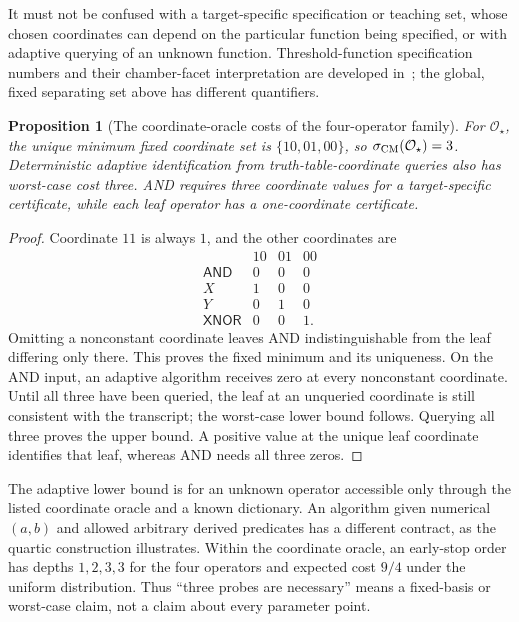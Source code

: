 \documentclass[11pt]{article}
\newtheorem{proposition}[theorem]{Proposition}
\theoremstyle{definition}
\theoremstyle{remark}
\newcommand{\AND}{\mathsf{AND}}
\newcommand{\XNOR}{\mathsf{XNOR}}
\newcommand{\Oo}{\mathcal O}
\begin{document}
It must not be confused with a target-specific specification or teaching set, whose chosen coordinates can depend on the particular function being specified, or with adaptive querying of an unknown function. Threshold-function specification numbers and their chamber-facet interpretation are developed in~\cite{Anthony2026}; the global, fixed separating set above has different quantifiers.

\begin{proposition}[The coordinate-oracle costs of the four-operator family]\label{prop:star}
For $\Oo_\star$, the unique minimum fixed coordinate set is $\{10,01,00\}$, so $\sigma_{\rm CM}(\Oo_\star)=3$. Deterministic adaptive identification from truth-table-coordinate queries also has worst-case cost three. AND requires three coordinate values for a target-specific certificate, while each leaf operator has a one-coordinate certificate.
\end{proposition}
\begin{proof}
Coordinate $11$ is always $1$, and the other coordinates are
\[
 \begin{array}{c|ccc}
 &10&01&00\\\hline
 \AND&0&0&0\\
 X&1&0&0\\
 Y&0&1&0\\
 \XNOR&0&0&1.
 \end{array}
\]
Omitting a nonconstant coordinate leaves AND indistinguishable from the leaf differing only there. This proves the fixed minimum and its uniqueness. On the AND input, an adaptive algorithm receives zero at every nonconstant coordinate. Until all three have been queried, the leaf at an unqueried coordinate is still consistent with the transcript; the worst-case lower bound follows. Querying all three proves the upper bound. A positive value at the unique leaf coordinate identifies that leaf, whereas AND needs all three zeros.
\end{proof}
The adaptive lower bound is for an unknown operator accessible only through the listed coordinate oracle and a known dictionary. An algorithm given numerical $(a,b)$ and allowed arbitrary derived predicates has a different contract, as the quartic construction illustrates. Within the coordinate oracle, an early-stop order has depths $1,2,3,3$ for the four operators and expected cost $9/4$ under the uniform distribution. Thus ``three probes are necessary'' means a fixed-basis or worst-case claim, not a claim about every parameter point.
\end{document}
